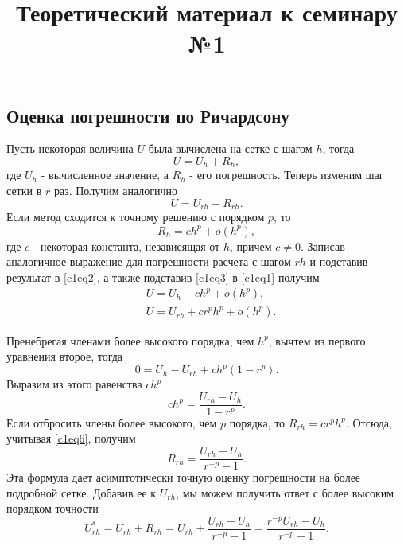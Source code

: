 \documentclass{article}
\title{Теоретический материал к семинару №1}
\date{}
\begin{document}
\maketitle
\subsection*{Оценка погрешности по Ричардсону}
Пусть некоторая величина $U$ была вычислена на сетке с шагом $h$, тогда
\begin{equation} \label{c1eq1}
	U = U_h + R_h,
\end{equation}
где $U_h$ - вычисленное значение, а $R_h$ - его погрешность. Теперь изменим шаг сетки в $r$ раз. Получим аналогично
\begin{equation} \label{c1eq2}
	U = U_{rh} + R_{rh}.
\end{equation}
Если метод сходится к точному решению с порядком $p$, то
\begin{equation} \label{c1eq3}
	R_h = ch^p + o(h^p),
\end{equation}
где $c$ - некоторая константа, независящая от $h$, причем $c \neq 0$.
Записав аналогичное выражение для погрешности расчета с шагом $rh$ и подставив результат в \eqref{c1eq2}, а также подставив \eqref{c1eq3} в \eqref{c1eq1} получим
\begin{equation} \label{c1eq4}
\begin{aligned}
	&U = U_h + ch^p + o(h^p), \\
	&U = U_{rh} + cr^ph^p + o(h^p).
\end{aligned}
\end{equation}

Пренебрегая членами более высокого порядка, чем $h^p$, вычтем из первого уравнения второе, тогда
\begin{equation} \label{c1eq5}
	0 = U_h - U_{rh} + ch^p(1-r^p).
\end{equation}
Выразим из этого равенства $ch^p$
\begin{equation} \label{c1eq6}
	ch^p = \frac{U_{rh} - U_h}{1 - r^p}.
\end{equation}
Если отбросить члены более высокого, чем $p$ порядка, то $R_{rh} = cr^ph^p$. Отсюда, учитывая \eqref{c1eq6}, получим
\begin{equation} \label{c1eq7}
	R_{rh} = \frac{U_{rh} - U_h}{r^{-p} - 1}.
\end{equation}
Эта формула дает асимптотически точную оценку погрешности на более подробной сетке. Добавив ее к $U_{rh}$, мы можем получить ответ с более высоким порядком точности
\begin{equation} \label{c1eq8}
	U_{rh}^* = U_{rh} + R_{rh} = U_{rh} + \frac{U_{rh} - U_h}{r^{-p} - 1} = \frac{r^{-p}U_{rh} - U_h}{r^{-p} - 1}.
\end{equation}
\end{document}
